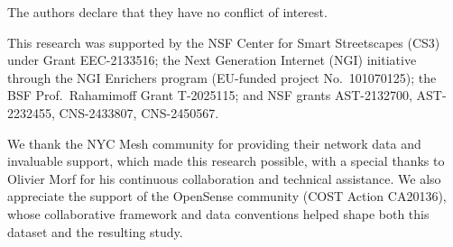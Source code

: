 \documentclass[manuscript]{copernicus}
\begin{document}








\appendixfigures  %

\appendixtables   %




\competinginterests
{
The authors declare that they have no conflict of interest.
} 

\begin{acknowledgements}
This research was supported by the NSF Center for Smart Streetscapes (CS3) under Grant EEC-2133516; the Next Generation Internet (NGI) initiative through the NGI Enrichers program (EU-funded project No.\ 101070125); the BSF Prof.\ Rahamimoff Grant T-2025115; and NSF grants AST-2132700, AST-2232455, CNS-2433807, CNS-2450567.

We thank the NYC Mesh community for providing their network data and invaluable support, which made this research possible, with a special thanks to Olivier Morf for his continuous collaboration and technical assistance. We also appreciate the support of the OpenSense community (COST Action CA20136), whose collaborative framework and data conventions helped shape both this dataset and the resulting study.
\end{acknowledgements}





\end{document}

